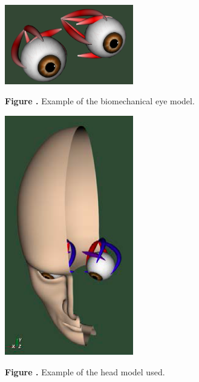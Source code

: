 \documentclass{frontiersSCNS}
\begin{document}

\begin{figure}[htb!]
\begin{center}
\includegraphics[width=0.5\textwidth]{./figures/bio_eye1.png}
\end{center}
\textbf{\label{fig:eye_muscles} Figure .}
{Example of the biomechanical eye model.}
\end{figure}

\begin{figure}[htb!]
\begin{center}
\includegraphics[width=0.5\textwidth]{./figures/bio_eye2.png}
\end{center}
\textbf{\label{fig:eye_head} Figure .}
{Example of the head model used.}
\end{figure}
\end{document}
